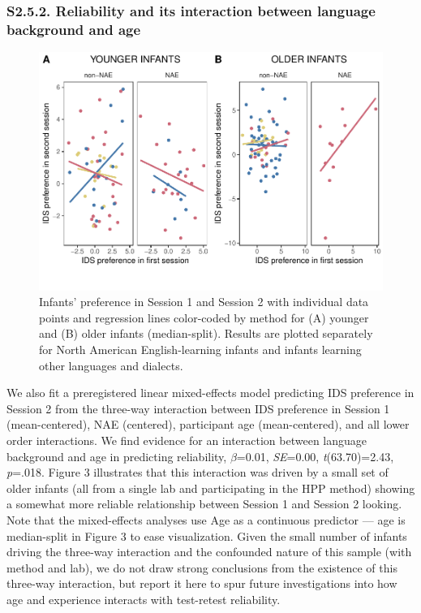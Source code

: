 \documentclass[
  man, donotrepeattitle,floatsintext]{apa6}
\begin{document}
\hypertarget{s2.5.2.-reliability-and-its-interaction-between-language-background-and-age}{%
\subsubsection{S2.5.2. Reliability and its interaction between language background and age}\label{s2.5.2.-reliability-and-its-interaction-between-language-background-and-age}}

\begin{figure}
\centering
\includegraphics{MB1T_supplement_files/figure-latex/fig3-1.pdf}
\caption{\label{fig:fig3}Infants' preference in Session 1 and Session 2 with individual data points and regression lines color-coded by method for (A) younger and (B) older infants (median-split). Results are plotted separately for North American English-learning infants and infants learning other languages and dialects.}
\end{figure}

We also fit a preregistered linear mixed-effects model predicting IDS preference in Session 2 from the three-way interaction between IDS preference in Session 1 (mean-centered), NAE (centered), participant age (mean-centered), and all lower order interactions.
We find evidence for an interaction between language background and age in predicting reliability, \(\beta\)=0.01, \emph{SE}=0.00, \emph{t}(63.70)=2.43, \emph{p}=.018.
Figure 3 illustrates that this interaction was driven by a small set of older infants (all from a single lab and participating in the HPP method) showing a somewhat more reliable relationship between Session 1 and Session 2 looking.
Note that the mixed-effects analyses use Age as a continuous predictor --- age is median-split in Figure 3 to ease visualization.
Given the small number of infants driving the three-way interaction and the confounded nature of this sample (with method and lab), we do not draw strong conclusions from the existence of this three-way interaction, but report it here to spur future investigations into how age and experience interacts with test-retest reliability.
\end{document}
